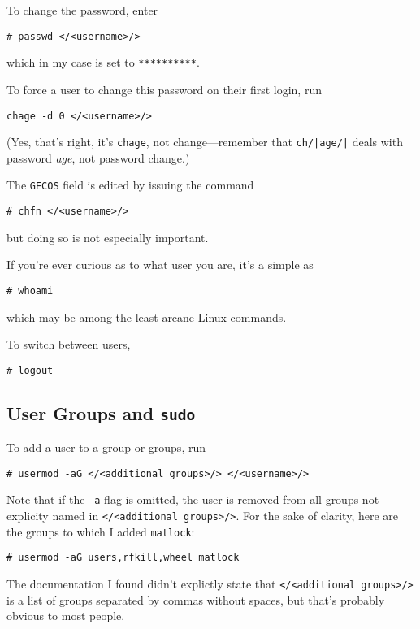 \documentclass[12pt,letterpaper]{article}
\begin{document}
\begin{enumerate}
To change the password, enter
\begin{lstlisting}
# passwd </<username>/>
\end{lstlisting}
which in my case is set to \lstinline{**********}.

To force a user to change this password on their first login, run
\begin{lstlisting}
chage -d 0 </<username>/>
\end{lstlisting}
(Yes, that's right, it's \lstinline{chage}, not change---remember that \lstinline{ch/|age/|} deals with password \emph{age}, not password change.)

The \lstinline{GECOS} field is edited by issuing the command
\begin{lstlisting}
# chfn </<username>/>
\end{lstlisting}
but doing so is not especially important.

If you're ever curious as to what user you are, it's a simple as
\begin{lstlisting}
# whoami
\end{lstlisting}
which may be among the least arcane Linux commands.

To switch between users,
\begin{lstlisting}
# logout
\end{lstlisting}

\subsection{User Groups and \lstinline{sudo}}

To add a user to a group or groups, run
\begin{lstlisting}
# usermod -aG </<additional groups>/> </<username>/>
\end{lstlisting}
Note that if the \lstinline{-a} flag is omitted, the user is removed from all groups not explicity named in \lstinline{</<additional groups>/>}.  For the sake of clarity, here are the groups to which I added \lstinline{matlock}:
\begin{lstlisting}
# usermod -aG users,rfkill,wheel matlock
\end{lstlisting}
The documentation I found didn't explictly state that \lstinline{</<additional groups>/>} is a list of groups separated by commas without spaces, but that's probably obvious to most people.


\end{enumerate}
\end{document}
